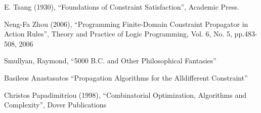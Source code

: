 \documentclass{article}
\begin{document}
  \begin{thebibliography}{1}

      E. Tsang (1930), ``Foundations of Constraint Satisfaction'', Academic Press.

      Neng-Fa Zhou (2006), ``Programming Finite-Domain Constraint Propagator in Action Rules'', Theory and Practice of Logic Programming, Vol. 6, No. 5, pp.483-508, 2006

      Smullyan, Raymond, ``5000 B.C. and Other Philosophical Fantasies''

      Basileos Anastasatos ``Propagation Algorithms for the Alldifferent Constraint''

      Christos Papadimitriou (1998), ``Combinatorial Optimization, Algorithms and Complexity'', Dover Publications


  \end{thebibliography}
\end{document}
